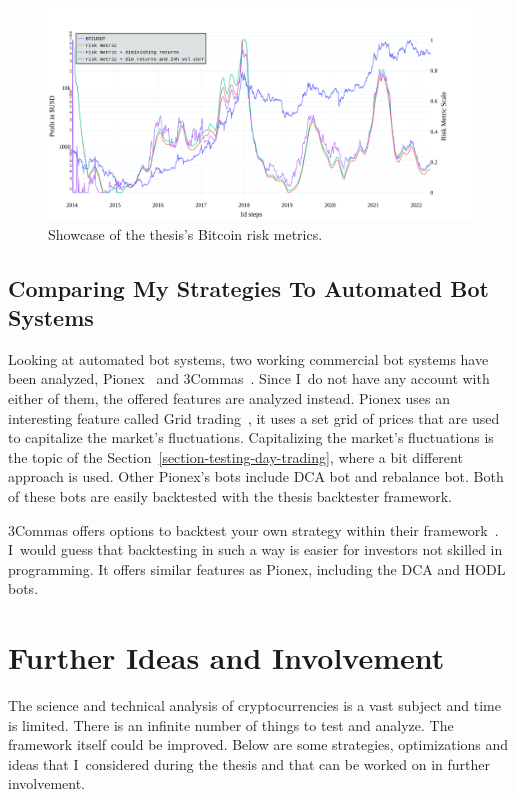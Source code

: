 \begin{figure}[!t]
    \centering
    \includegraphics[width=\columnwidth]{figures/combined-bitcoin-metrics.pdf}
    \caption{Showcase of the thesis's Bitcoin risk metrics.}
    \label{figure-combined-bitcoin-riskmetric}
\end{figure}

\subsection*{Comparing My Strategies To Automated Bot Systems}
Looking at automated bot systems, two working commercial bot systems have been analyzed, Pionex~\cite{pionex} and 3Commas~\cite{3commas}. Since I~do not have any account with either of them, the offered features are analyzed instead. Pionex uses an interesting feature called Grid trading~\cite{pionex-grid-trading}, it uses a set grid of prices that are used to capitalize the market's fluctuations. Capitalizing the market's fluctuations is the topic of the Section~\ref{section-testing-day-trading}, where a bit different approach is used. Other Pionex's bots include DCA bot and rebalance bot. Both of these bots are easily backtested with the thesis backtester framework.

3Commas offers options to backtest your own strategy within their framework~\cite{3commas-trading-view}. I~would guess that backtesting in such a way is easier for investors not skilled in programming. It offers similar features as Pionex, including the DCA and HODL bots.


\section{Further Ideas and Involvement}
The science and technical analysis of cryptocurrencies is a vast subject and time is limited. There is an infinite number of things to test and analyze. The framework itself could be improved. Below are some strategies, optimizations and ideas that I~considered during the thesis and that can be worked on in further involvement.

